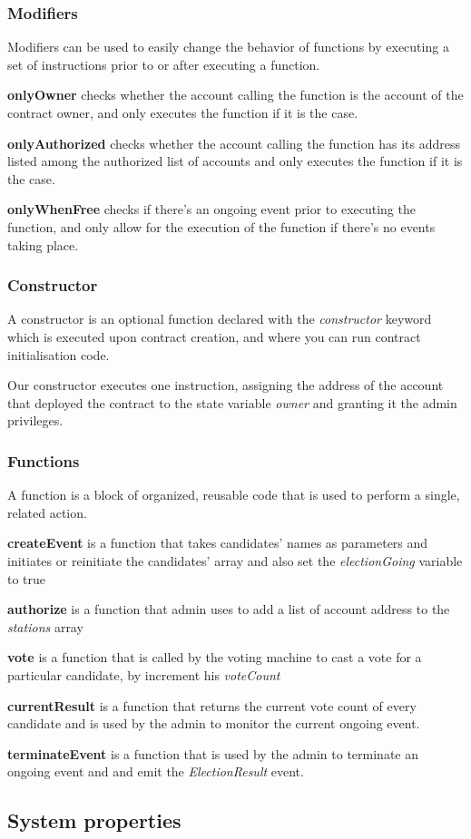 \subsubsection{Modifiers}

Modifiers can be used to easily change the behavior of functions by executing a set of instructions prior to or after executing a function.

\begin{list}{}{}
\item \textbf{onlyOwner} checks whether the account calling the function is the account of the contract owner, and only executes the function if it is the case.
\item \textbf{onlyAuthorized} checks whether the account calling the function has its address listed among the authorized list of accounts and only executes the function if it is the case.
\item \textbf{onlyWhenFree} checks if there's an ongoing event prior to executing the function, and only allow for the execution of the function if there's no events taking place.
\end{list}

\subsubsection{Constructor}

A constructor is an optional function declared with the \textit{constructor} keyword which is executed upon contract creation, and where you can run contract initialisation code.

Our constructor executes one instruction, assigning the address of the account that deployed the contract to the state variable \textit{owner} and granting it the admin privileges.

\subsubsection{Functions}

A function is a block of organized, reusable code that is used to perform a single, related action.

\begin{list}{}{}
\item \textbf{createEvent} is a function that takes candidates' names as parameters and initiates or reinitiate the candidates' array and also set the \textit{electionGoing} variable to true
\item \textbf{authorize} is a function that admin uses to add a list of account address to the \textit{stations} array
\item \textbf{vote} is a function that is called by the voting machine to cast a vote for a particular candidate, by increment his \textit{voteCount}
\item \textbf{currentResult} is a function that returns the current vote count of every candidate and is used by the admin to monitor the current ongoing event.
\item \textbf{terminateEvent} is a function that is used by the admin to terminate an ongoing event and and emit the \textit{ElectionResult} event.
\end{list}

\subsection{System properties}
